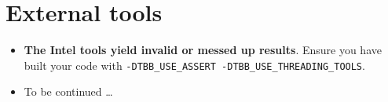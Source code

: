 


\section{External tools}
\begin{itemize}
  \item \textbf{The Intel tools yield invalid or messed up results}. Ensure 
    you have built your code with \texttt{-DTBB\_USE\_ASSERT -DTBB\_USE\_THREADING\_TOOLS}.
  \item To be continued \dots
\end{itemize}



